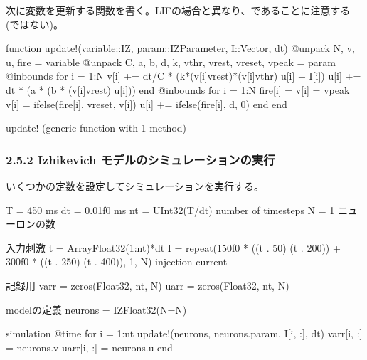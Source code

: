 \documentclass[letterpaper,10pt,english]{sphinxmanual}
\begin{document}
次に変数を更新する関数を書く。LIFの場合と異なり、であることに注意する (ではない)。

\begin{sphinxVerbatim}[commandchars=\\\{\}]
function update!(variable::IZ, param::IZParameter, I::Vector, dt)
    @unpack N, v, u, fire = variable
    @unpack C, a, b, d, k, vthr, vrest, vreset, vpeak = param
    @inbounds for i = 1:N
        v[i] += dt/C * (k*(v[i]\PYGZhy{}vrest)*(v[i]\PYGZhy{}vthr) \PYGZhy{} u[i] + I[i])
        u[i] += dt * (a * (b * (v[i]\PYGZhy{}vrest) \PYGZhy{} u[i]))
    end
    @inbounds for i = 1:N
        fire[i] = v[i] \PYGZgt{}= vpeak
        v[i] = ifelse(fire[i], vreset, v[i])
        u[i] += ifelse(fire[i], d, 0)
    end
end
\end{sphinxVerbatim}

\begin{sphinxVerbatim}[commandchars=\\\{\}]
update! (generic function with 1 method)
\end{sphinxVerbatim}


\subsubsection{2.5.2 Izhikevich モデルのシミュレーションの実行}
\label{\detokenize{2-5_iz:id6}}
いくつかの定数を設定してシミュレーションを実行する。

\begin{sphinxVerbatim}[commandchars=\\\{\}]
T = 450 \PYGZsh{} ms
dt = 0.01f0 \PYGZsh{} ms
nt = UInt32(T/dt) \PYGZsh{} number of timesteps
N = 1 \PYGZsh{} ニューロンの数

\PYGZsh{} 入力刺激
t = Array\PYGZob{}Float32\PYGZcb{}(1:nt)*dt
I = repeat(150f0 * ((t .\PYGZgt{} 50) \PYGZhy{} (t .\PYGZgt{} 200)) + 300f0 * ((t .\PYGZgt{} 250) \PYGZhy{} (t .\PYGZgt{} 400)), 1, N)  \PYGZsh{} injection current

\PYGZsh{} 記録用
varr = zeros(Float32, nt, N)
uarr = zeros(Float32, nt, N)

\PYGZsh{} modelの定義
neurons = IZ\PYGZob{}Float32\PYGZcb{}(N=N)

\PYGZsh{} simulation
@time for i = 1:nt
    update!(neurons, neurons.param, I[i, :], dt)
    varr[i, :] = neurons.v
    uarr[i, :] = neurons.u
end
\end{sphinxVerbatim}
\end{document}
